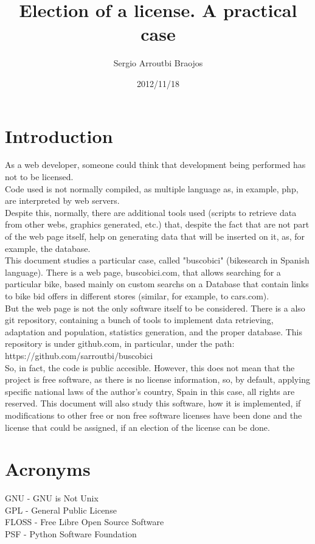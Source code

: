 \documentclass[11pt]{article}
\title{\textbf{Election of a license. A practical case}}
\author{Sergio Arroutbi Braojos}
\date{2012/11/18}
\begin{document}
\maketitle

\section{Introduction}

As a web developer, someone could think that development being performed has not to be licensed.\\
Code used is not normally compiled, as multiple language as, in example, php, are interpreted by web servers. \\
Despite this, normally, there are additional tools used (scripts to retrieve data from other webs, graphics generated, etc.) that, despite the fact that are not part of the web page itself, help on generating data that will be inserted on it, as, for example, the database. \\
This document studies a particular case, called "buscobici" (bikesearch in Spanish language). There is a web page, buscobici.com, that allows searching for a particular bike, based mainly on custom searchs on a Database that contain links to bike bid offers in different stores (similar, for example, to cars.com). \\
But the web page is not the only software itself to be considered. There is a also git repository, containing a bunch of tools to implement data retrieving, adaptation and population, statistics generation, and the proper database. This repository is under github.com, in particular, under the path: \\
https://github.com/sarroutbi/buscobici \\
So, in fact, the code is public accesible. However, this does not mean that the project is free software, as there is no license information, so, by default, applying specific national laws of the author's country, Spain in this case, all rights are reserved. 
This document will also study this software, how it is implemented, if modifications to other free or non free software licenses have been done and the license that could be assigned, if an election of the license can be done. 

\section{Acronyms}

GNU - GNU is Not Unix\\
GPL - General Public License\\
FLOSS - Free Libre Open Source Software\\
PSF - Python Software Foundation\\
\end{document}
